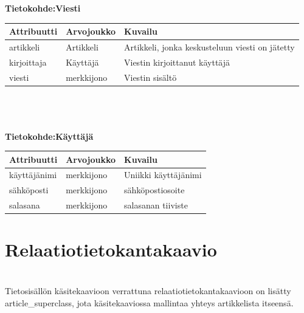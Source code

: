 \documentclass[12pt]{article}
\begin{document}
        \textbf{Tietokohde:Viesti} \\
        \begin{tabular}{|p{8em}|p{8em}|p{13em}|} \hline
            \textbf{Attribuutti} & \textbf{Arvojoukko} & \textbf{Kuvailu} \\ \hline
                    artikkeli
                &   Artikkeli
                &   Artikkeli, jonka keskusteluun viesti on jätetty
            \\ \hline
                    kirjoittaja
                &   Käyttäjä
                &   Viestin kirjoittanut käyttäjä
            \\ \hline
                    viesti
                &   merkkijono
                &   Viestin sisältö
            \\ \hline
        \end{tabular} \\ \\ \\


        \textbf{Tietokohde:Käyttäjä} \\
        \begin{tabular}{|p{8em}|p{8em}|p{13em}|} \hline
            \textbf{Attribuutti} & \textbf{Arvojoukko} & \textbf{Kuvailu} \\ \hline
                    käyttäjänimi
                &   merkkijono
                &   Uniikki käyttäjänimi
            \\ \hline
                    sähköposti
                &   merkkijono
                &   sähköpostiosoite
            \\ \hline
                    salasana
                &   merkkijono
                &   salasanan tiiviste
            \\ \hline
        \end{tabular}
  \newpage

  \section{Relaatiotietokantakaavio}
         \\
        Tietosisällön käsitekaavioon verrattuna relaatiotietokantakaavioon on lisätty article\_superclass, jota käsitekaaviossa mallintaa yhteys artikkelista itseensä.
        
\end{document}
